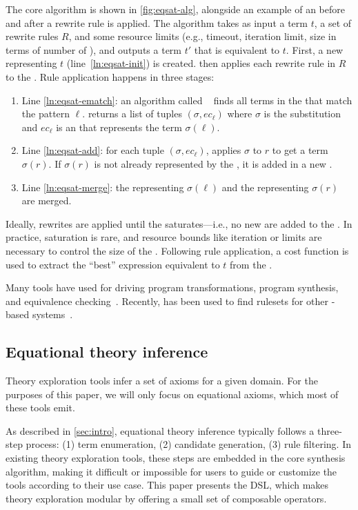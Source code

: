 The core algorithm
  is shown in \autoref{fig:eqsat-alg}, alongside an example of an \egraph
  before and after a rewrite rule is applied.
The \eqsat algorithm takes as input a term $t$, a set of rewrite rules $R$,
 and some resource limits (e.g., timeout, iteration limit, \egraph size in terms
 of number of \enodes),
 and outputs a term $t'$ that is equivalent to $t$.
First, a new \egraph representing $t$ (line~\ref{ln:eqsat-init}) is created.
\Eqsat then applies each rewrite rule in $R$ to the \egraph.
Rule application happens in three stages:

\begin{enumerate}
  \item Line \ref{ln:eqsat-ematch}: an algorithm called
    \ematching~\citep{simplify, cade} finds all terms in the \egraph that
    match the pattern $\ell$.
    \Ematching returns a list of tuples
    $(\sigma, ec_\ell)$ where $\sigma$ is the substitution and $ec_\ell$ is an
    \eclass that represents the term $\sigma(\ell)$.
  \item Line \ref{ln:eqsat-add}: for each tuple
   $(\sigma, ec_\ell)$, \eqsat applies $\sigma$ to
   $r$ to get a term $\sigma(r)$.
  If $\sigma(r)$ is not already represented by the
    \egraph, it is added in a new
    \eclass.
  \item Line \ref{ln:eqsat-merge}:
   the \eclass representing $\sigma(\ell)$ and the \eclass
   representing $\sigma(r)$ are merged.
\end{enumerate}

Ideally, rewrites are applied until the \egraph
  saturates---i.e., no new \enodes are added to the \egraph.
In practice,
  saturation is rare,
  and resource bounds like iteration or
  \enode limits are necessary to control the size of the \egraph.
Following rule application, a cost function is used to
  extract the ``best'' expression
  equivalent to $t$ from the \egraph.

Many tools have used \eqsat for driving program transformations, program
  synthesis, and equivalence checking~\citep{eqsat, herbie, szalinski, spores, yogo, alexa}.
Recently, \eqsat has been used to find rulesets
  for other \eqsat-based systems~\citep{cav21, ruler}.

\subsection{Equational theory inference}

Theory exploration tools
  infer a set of axioms
  for a given domain.
For the purposes of this paper,
 we will only focus on equational axioms,
 which most of these tools emit.

As described in \autoref{sec:intro}, equational theory inference
  typically follows a three-step process: (1) term enumeration, (2) candidate
  generation, (3) rule filtering.
In existing theory exploration tools,
 these steps are embedded in the core synthesis algorithm,
 making it difficult or impossible
 for users to guide or customize
 the tools according to their use case.
This paper presents the \enumo DSL,
  which makes theory exploration modular by
  offering a small set of
  composable operators.

